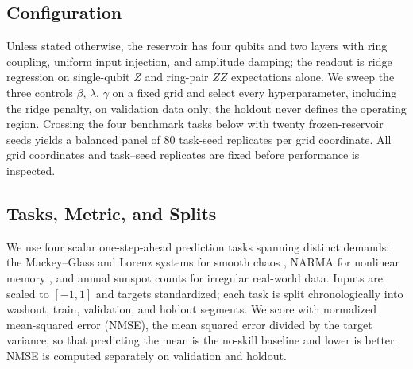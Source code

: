 \documentclass[10pt,conference]{IEEEtran}
\begin{document}
\subsection{Configuration}
Unless stated otherwise, the reservoir has four qubits and two layers with ring coupling, uniform input injection, and amplitude damping; the readout is ridge regression on single-qubit $Z$ and ring-pair $ZZ$ expectations alone. We sweep the three controls $\beta$, $\lambda$, $\gamma$ on a fixed grid and select every hyperparameter, including the ridge penalty, on validation data only; the holdout never defines the operating region. Crossing the four benchmark tasks below with twenty frozen-reservoir seeds yields a balanced panel of $80$ task-seed replicates per grid coordinate. All grid coordinates and task–seed replicates are fixed before performance is inspected.



\subsection{Tasks, Metric, and Splits}
We use four scalar one-step-ahead prediction tasks spanning distinct demands: the Mackey--Glass and Lorenz systems for smooth chaos \cite{mackey1977,lorenz1963}, NARMA for nonlinear memory \cite{narendra1990}, and annual sunspot counts for irregular real-world data. Inputs are scaled to $[-1,1]$ and targets standardized; each task is split chronologically into washout, train, validation, and holdout segments. We score with normalized mean-squared error (NMSE), the mean squared error divided by the target variance, so that predicting the mean is the no-skill baseline and lower is better. NMSE is computed separately on validation and holdout.
\end{document}

